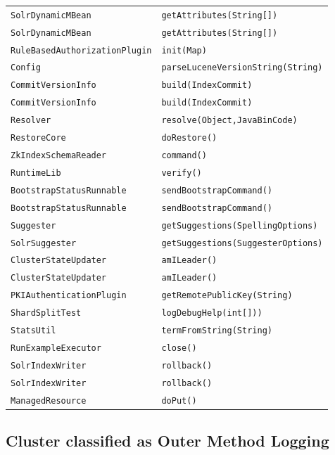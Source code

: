 \begin{center}
\begin{longtable}{ll}
\lstinline/SolrDynamicMBean/&{\lstinline/getAttributes(String[])/}\\
\lstinline/SolrDynamicMBean/&{\lstinline/getAttributes(String[])/}\\
\lstinline/RuleBasedAuthorizationPlugin/&{\lstinline/init(Map)/}\\
\lstinline/Config/&{\lstinline/parseLuceneVersionString(String)/}\\
\lstinline/CommitVersionInfo/&{\lstinline/build(IndexCommit)/}\\
\lstinline/CommitVersionInfo/&{\lstinline/build(IndexCommit)/}\\
\lstinline/Resolver/&{\lstinline/resolve(Object,JavaBinCode)/}\\
\lstinline/RestoreCore/&{\lstinline/doRestore()/}\\
\lstinline/ZkIndexSchemaReader/&{\lstinline/command()/}\\
\lstinline/RuntimeLib/&{\lstinline/verify()/}\\
\lstinline/BootstrapStatusRunnable/&{\lstinline/sendBootstrapCommand()/}\\
\lstinline/BootstrapStatusRunnable/&{\lstinline/sendBootstrapCommand()/}\\
\lstinline/Suggester/&{\lstinline/getSuggestions(SpellingOptions)/}\\
\lstinline/SolrSuggester/&{\lstinline/getSuggestions(SuggesterOptions)/}\\
\lstinline/ClusterStateUpdater/&{\lstinline/amILeader()/}\\
\lstinline/ClusterStateUpdater/&{\lstinline/amILeader()/}\\
\lstinline/PKIAuthenticationPlugin/&{\lstinline/getRemotePublicKey(String)/}\\
\lstinline/ShardSplitTest/&{\lstinline/logDebugHelp(int[]))/}\\
\lstinline/StatsUtil/&{\lstinline/termFromString(String)/}\\
\lstinline/RunExampleExecutor/&{\lstinline/close()/}\\
\lstinline/SolrIndexWriter/&{\lstinline/rollback()/}\\
\lstinline/SolrIndexWriter/&{\lstinline/rollback()/}\\
\lstinline/ManagedResource/&{\lstinline/doPut()/}\\
\end{longtable}
\end{center}


\subsection{Cluster classified as Outer Method Logging}

